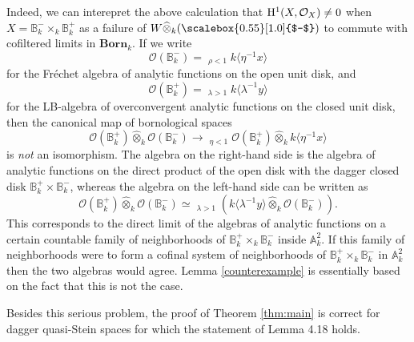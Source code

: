 \documentclass[11pt,leqno,a4paper]{amsart}
\theoremstyle{remark}
\theoremstyle{definition}
\numberwithin{equation}{theorem}
\def\A{{\mathbb A}}
\def\B{{\mathbb B}}
\def\cO{{\mathcal O}}
\def\limpro{\mathop{\lim\limits_{\displaystyle\leftarrow}}}
\def\limind{\mathop{\lim\limits_{\displaystyle\rightarrow}}}
\def\bBorn{\mathbf{Born}}
\def\wotimes{\widehat{\otimes}}
\newcommand{\tate}[1]{\langle #1 \rangle}
\newcommand{\minus}{\scalebox{0.55}[1.0]{$-$}}
\begin{document}
Indeed, we can interepret the above calculation that ${\rm H}^1(X,\cO_X)\neq 0$ when $X=\B^-_k\times_k \B^+_k$ as a failure of $W \wotimes_k (\minus)$  to commute with cofiltered limits in ${\bBorn}_k$. If we write 
\[ \cO(\B_k^-) = \limpro_{\rho < 1} k \tate{ \eta^{-1} x }  \]
for the Fr\'echet algebra of analytic functions on the open unit disk, and
\[ \cO(\B_k^+) = \limind_{\lambda > 1} k \tate{ \lambda^{-1} y } \]
for the LB-algebra of overconvergent analytic functions on the closed unit disk, then the canonical map of bornological spaces
\[ \cO(\B_k^+) \wotimes_k \cO(\B_k^-) \to \limpro_{\eta < 1} \cO(\B_k^+) \wotimes_k k \tate{ \eta^{-1} x } \]
is \emph{not} an isomorphism. The algebra on the right-hand side is the algebra of analytic functions on the direct product of the open disk with the dagger closed disk $\B_k^+ \times \B_k^-$, whereas the algebra on the left-hand side can be written as 
\[ \cO(\B_k^+) \wotimes_k \cO(\B_k^-) \simeq \limind_{\lambda > 1} ( k \tate{ \lambda^{-1} y } \wotimes_k \cO(\B_k^-) ). \] 
This corresponds to the direct limit of the algebras of analytic functions on a certain countable family of neighborhoods of $\B_k^+ \times_k \B_k^-$ inside $\A_k^2$. If this family of neighborhoods were to form a cofinal system of neighborhoods of $\B_k^+ \times_k \B_k^-$ in $\A_k^2$ then the two algebras would agree. Lemma \ref{counterexample} is essentially based on the fact that this is not the case.


Besides this serious problem, the proof of Theorem \ref{thm:main} is correct for dagger quasi-Stein spaces for which the statement of Lemma 4.18 holds.
\end{document}
